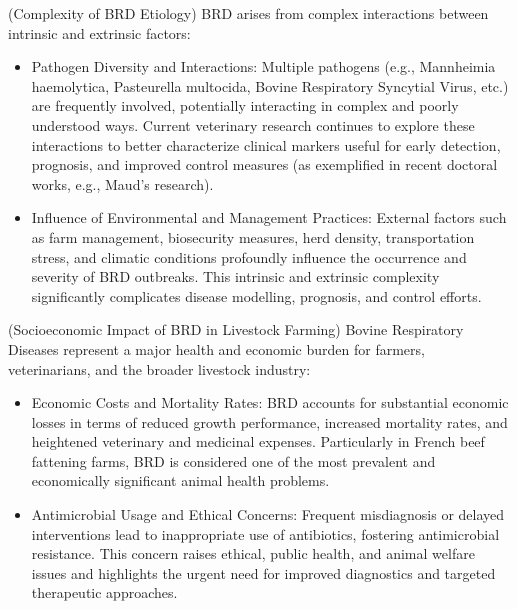 (Complexity of BRD Etiology) BRD arises from complex interactions between intrinsic and extrinsic factors:
\begin{itemize}
    \item Pathogen Diversity and Interactions: Multiple pathogens (e.g., Mannheimia haemolytica, Pasteurella multocida, Bovine Respiratory Syncytial Virus, etc.) are frequently involved, potentially interacting in complex and poorly understood ways. Current veterinary research continues to explore these interactions to better characterize clinical markers useful for early detection, prognosis, and improved control measures (as exemplified in recent doctoral works, e.g., Maud’s research).
    \item Influence of Environmental and Management Practices: External factors such as farm management, biosecurity measures, herd density, transportation stress, and climatic conditions profoundly influence the occurrence and severity of BRD outbreaks. This intrinsic and extrinsic complexity significantly complicates disease modelling, prognosis, and control efforts.
\end{itemize}


(Socioeconomic Impact of BRD in Livestock Farming) Bovine Respiratory Diseases represent a major health and economic burden for farmers, veterinarians, and the broader livestock industry:
\begin{itemize}
    \item Economic Costs and Mortality Rates: BRD accounts for substantial economic losses in terms of reduced growth performance, increased mortality rates, and heightened veterinary and medicinal expenses. Particularly in French beef fattening farms, BRD is considered one of the most prevalent and economically significant animal health problems.
    \item Antimicrobial Usage and Ethical Concerns: Frequent misdiagnosis or delayed interventions lead to inappropriate use of antibiotics, fostering antimicrobial resistance. This concern raises ethical, public health, and animal welfare issues and highlights the urgent need for improved diagnostics and targeted therapeutic approaches.
\end{itemize}

